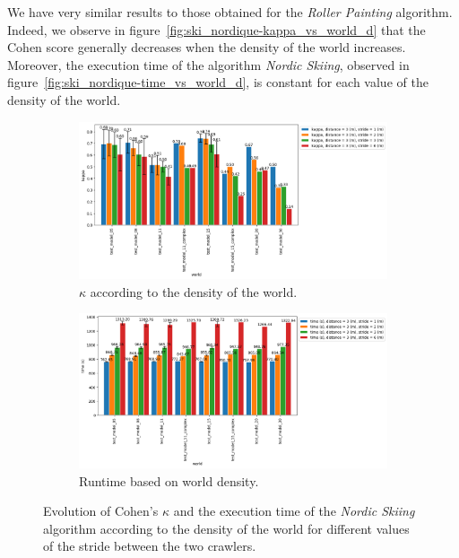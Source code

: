 \documentclass[english,RandD]{rapportPFE}  %
\begin{document}
			We have very similar results to those obtained for the \textit{Roller Painting} algorithm.
			Indeed, we observe in figure~\ref{fig:ski_nordique-kappa_vs_world_d} that the Cohen score generally decreases when the density of the world increases.
			Moreover, the execution time of the algorithm \textit{Nordic Skiing}, observed in figure~\ref{fig:ski_nordique-time_vs_world_d}, is constant for each value of the density of the world.

			\begin{figure}[h!]
				\centering
				\begin{subfigure}[t]{0.9\linewidth}
					\includegraphics[width=\linewidth]{graphics/ski_nordique-kappa_vs_world_for_each_s.png}
					\caption{$\kappa$ according to the density of the world.}
					\label{fig:ski_nordique-kappa_vs_world_s}
				\end{subfigure}
				\hfill
				\begin{subfigure}[t]{0.9\linewidth}
					\includegraphics[width=\linewidth]{graphics/ski_nordique-time_vs_world_for_each_s.png}
					\caption{Runtime based on world density.}
					\label{fig:ski_nordique-time_vs_world_s}
				\end{subfigure}
				\caption{Evolution of Cohen's $\kappa$ and the execution time of the \textit{Nordic Skiing} algorithm according to the density of the world for different values of the stride between the two crawlers.}
				\label{fig:ski_nordique-world_s}
			\end{figure}
\end{document}
